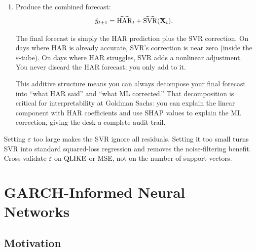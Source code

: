 \begin{enumerate}
  \item Produce the combined forecast:
        \begin{equation}\label{eq:har-svr-combined}
          \hat{y}_{t+1} = \widehat{\operatorname{HAR}}_t + \widehat{\text{SVR}}(\mathbf{X}_t).
        \end{equation}

        \begin{intuition}
        The final forecast is simply the HAR prediction plus the SVR
        correction.  On days where HAR is already accurate, SVR's
        correction is near zero (inside the $\varepsilon$-tube).  On days
        where HAR struggles, SVR adds a nonlinear adjustment.  You never
        discard the HAR forecast; you only add to it.
        \end{intuition}

        \begin{projectconnection}
        This additive structure means you can always decompose your final
        forecast into ``what HAR said'' and ``what ML corrected.''  That
        decomposition is critical for interpretability at Goldman Sachs:
        you can explain the linear component with HAR coefficients and
        use SHAP values to explain the ML correction, giving the desk a
        complete audit trail.
        \end{projectconnection}
\end{enumerate}

\begin{warning}
Setting $\varepsilon$ too large makes the SVR ignore all residuals.
Setting it too small turns SVR into standard squared-loss regression and
removes the noise-filtering benefit.  Cross-validate $\varepsilon$ on
$\operatorname{QLIKE}$ or MSE, not on the number of support vectors.
\end{warning}


\section{GARCH-Informed Neural Networks}\label{sec:hybrid:ginn}

\subsection{Motivation}


